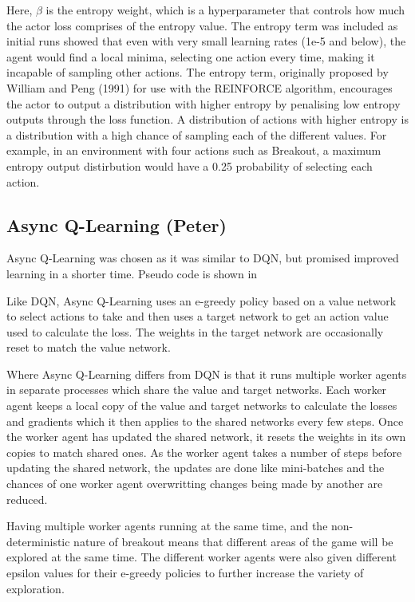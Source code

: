 \documentclass{article}
\begin{document}
Here, $\beta$ is the entropy weight, which is a hyperparameter that controls how much the actor loss comprises of the entropy value. The entropy term was included as initial runs showed that even with very small learning rates (1e-5 and below), the agent would find a local minima, selecting one action every time, making it incapable of sampling other actions. The entropy term, originally proposed by William and Peng (1991) for use with the REINFORCE algorithm, encourages the actor to output a distribution with higher entropy by penalising low entropy outputs through the loss function. A distribution of actions with higher entropy is a distribution with a high chance of sampling each of the different values. For example, in an environment with four actions such as Breakout, a maximum entropy output distirbution would have a 0.25 probability of selecting each action.

\subsection{Async Q-Learning (Peter)}

Async Q-Learning was chosen as it was similar to DQN, but promised improved learning in a shorter time.
Pseudo code is shown in 

Like DQN, Async Q-Learning uses an e-greedy policy based on a value network to select actions to take and then uses a target network to get an action value used to calculate the loss.
The weights in the target network are occasionally reset to match the value network.

Where Async Q-Learning differs from DQN is that it runs multiple worker agents in separate processes which share the value and target networks.
Each worker agent keeps a local copy of the value and target networks to calculate the losses and gradients which it then applies to the shared networks every few steps.
Once the worker agent has updated the shared network, it resets the weights in its own copies to match shared ones.
As the worker agent takes a number of steps before updating the shared network, the updates are done like mini-batches and the chances of one worker agent overwritting changes being made by another are reduced.

Having multiple worker agents running at the same time, and the non-deterministic nature of breakout means that different areas of the game will be explored at the same time.
The different worker agents were also given different epsilon values for their e-greedy policies to further increase the variety of exploration.
\end{document}
